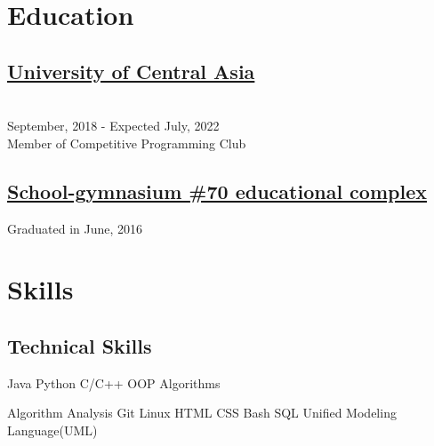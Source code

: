 \documentclass[]{deedy-resume-openfont}
\begin{document}
\begin{minipage}[t]{0.40\textwidth} 


\section{Education} 

\subsection{\href{https://ucentralasia.org/}{University of Central Asia}}\\
September, 2018 - Expected July, 2022\\
Member of Competitive Programming Club


\sectionsep

\subsection{\href{https://70.edubishkek.kg/o-nas/}{School-gymnasium \#70 \newline
educational complex}}
Graduated in June, 2016\\









\section{Skills}


\subsection{Technical Skills}
Java \textbullet{}  Python \textbullet{}  C/C++ %
\textbullet{} OOP
\textbullet{} Algorithms

\textbullet{} Algorithm Analysis \textbullet{} 
Git\textbullet{} Linux \textbullet{}  HTML \textbullet{} CSS \textbullet{} Bash
\textbullet{} SQL \textbullet{} Unified Modeling Language(UML)
\sectionsep


\end{minipage}
\end{document}
